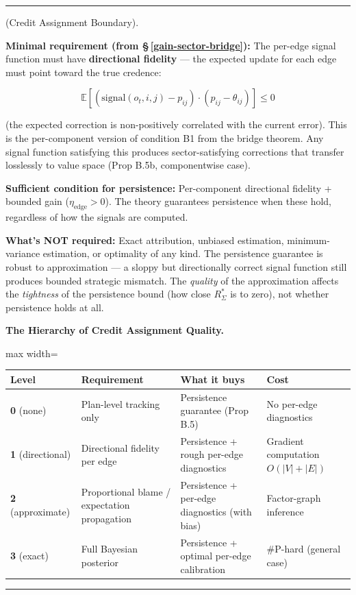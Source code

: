 \documentclass[11pt,oneside]{article}
\newcounter{claim}[section]
\renewcommand{\theclaim}{\thesection.\arabic{claim}}
\newenvironment{segment}[2]{%
  \refstepcounter{claim}%
  \bigskip\noindent\hrule\smallskip
  \noindent{\bfseries #1~\theclaim}\enskip(#2).\par\smallskip
  \noindent\ignorespaces
}{%
  \par\smallskip\noindent\hrule\bigskip
}
\newenvironment{discussion}[1][]{\begin{segment}{Discussion}{#1}}{\end{segment}}
\begin{document}
\begin{discussion}[Credit Assignment Boundary]
\textbf{Minimal requirement (from \S\,\ref{gain-sector-bridge}):} The per-edge signal function must have \textbf{directional fidelity} — the expected update for each edge must point toward the true credence:

$$\mathbb{E}[(\text{signal}(o_t, i, j) - p_{ij}) \cdot (p_{ij} - \theta_{ij})] \leq 0$$

(the expected correction is non-positively correlated with the current error). This is the per-component version of condition B1 from the bridge theorem. Any signal function satisfying this produces sector-satisfying corrections that transfer losslessly to value space (Prop B.5b, componentwise case).

\textbf{Sufficient condition for persistence:} Per-component directional fidelity + bounded gain ($\eta_{\text{edge}} > 0$). The theory guarantees persistence when these hold, regardless of how the signals are computed.

\textbf{What's NOT required:} Exact attribution, unbiased estimation, minimum-variance estimation, or optimality of any kind. The persistence guarantee is robust to approximation — a sloppy but directionally correct signal function still produces bounded strategic mismatch. The \textit{quality} of the approximation affects the \textit{tightness} of the persistence bound (how close $R^*_\Sigma$ is to zero), not whether persistence holds at all.


\medskip\noindent\textbf{The Hierarchy of Credit Assignment Quality.}


\begin{adjustbox}{max width=\textwidth}
\small
\begin{tabular}{llll}
\toprule
Level & Requirement & What it buys & Cost \\
\midrule
\textbf{0} (none) & Plan-level tracking only & Persistence guarantee (Prop B.5) & No per-edge diagnostics \\
\textbf{1} (directional) & Directional fidelity per edge & Persistence + rough per-edge diagnostics & Gradient computation $O(\lvert V\rvert + \lvert E\rvert)$ \\
\textbf{2} (approximate) & Proportional blame / expectation propagation & Persistence + per-edge diagnostics (with bias) & Factor-graph inference \\
\textbf{3} (exact) & Full Bayesian posterior & Persistence + optimal per-edge calibration & \#P-hard (general case) \\
\bottomrule
\end{tabular}
\end{adjustbox}



\end{discussion}
\end{document}
